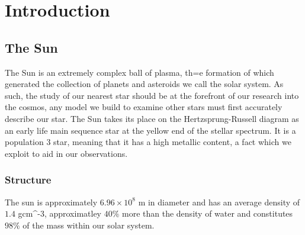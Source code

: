 \label{ch:Intro}
\chapter{Introduction}  %





\section{The Sun}
The Sun is an extremely complex ball of plasma, th=e formation of which generated the collection of planets and asteroids we call the solar system.
As such, the study of our nearest star should be at the forefront of our research into the cosmos, any model we build to examine other stars must first accurately describe our star. 
The Sun takes its place on the Hertzsprung-Russell diagram as an early life main sequence star at the yellow end of the stellar spectrum.
It is a population 3 star, meaning that it has a high metallic content, a fact which we exploit to aid in our observations.

\subsection{Structure}
The sun is approximately $6.96 \times 10^{8}$ m in diameter and has an average density of $1.4$ gcm^{-3}, approximatley $40\%$ more than the density of water and constitutes $98\%$ of the mass within our solar system.

